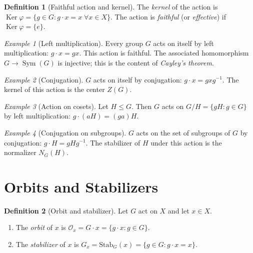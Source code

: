 \documentclass[12pt,a4paper,openany]{book}
\theoremstyle{definition}
\newtheorem{definition}{Definition}[chapter]
\theoremstyle{remark}
\newtheorem{example}{Example}[chapter]
\DeclareMathOperator{\Sym}{Sym}
\DeclareMathOperator{\Ker}{Ker}
\begin{document}
\begin{definition}[Faithful action and kernel]\label{def:faithful-kernel-action}
The \emph{kernel} of the action is
$\Ker\varphi=\{g\in G : g\cdot x=x\;\forall x\in X\}$.
The action is \emph{faithful} (or \emph{effective}) if
$\Ker\varphi=\{e\}$.
\end{definition}

\begin{example}[Left multiplication]\label{ex:left-mult-action}
Every group $G$ acts on itself by left multiplication:
$g\cdot x = gx$.  This action is faithful.
The associated homomorphism $G\to\Sym(G)$ is injective; this is the
content of \emph{Cayley's theorem}.
\end{example}

\begin{example}[Conjugation]\label{ex:conjugation-action}
$G$ acts on itself by conjugation: $g\cdot x = gxg^{-1}$.  The kernel
of this action is the center $Z(G)$.
\end{example}

\begin{example}[Action on cosets]\label{ex:coset-action}
Let $H\le G$.  Then $G$ acts on $G/H=\{gH : g\in G\}$ by left
multiplication: $g\cdot(aH)=(ga)H$.
\end{example}

\begin{example}[Conjugation on subgroups]\label{ex:conjugation-subgroups}
$G$ acts on the set of subgroups of $G$ by conjugation:
$g\cdot H = gHg^{-1}$.
The stabilizer of $H$ under this action is the normalizer $N_G(H)$.
\end{example}

\section{Orbits and Stabilizers}\label{sec:orbits-stabilizers}

\begin{definition}[Orbit and stabilizer]\label{def:orbit-stabilizer}
Let $G$ act on $X$ and let $x\in X$.
\begin{enumerate}
\item The \emph{orbit} of $x$ is
$\mathcal{O}_x = G\cdot x = \{g\cdot x : g\in G\}$.
\item The \emph{stabilizer} of $x$ is
$G_x = \mathrm{Stab}_G(x) = \{g\in G : g\cdot x = x\}$.
\end{enumerate}
\end{definition}
\end{document}
